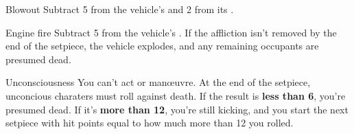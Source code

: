 
\begin{describe}{Blowout}
  Subtract 5 from the vehicle's  and 2 from its .
\end{describe}

\begin{describe}{Engine fire}
  Subtract 5 from the vehicle's . If the affliction isn't removed by the end of the setpiece, the vehicle explodes, and any remaining occupants are presumed dead.
\end{describe}

\begin{describe}{Unconsciousness}
  You can't act or man\oe{}uvre. At the end of the setpiece, unconcious charaters must roll  against death. If the result is \textbf{less than 6}, you're presumed dead. If it's \textbf{more than 12}, you're still kicking, and you start the next setpiece with hit points equal to how much more than 12 you rolled.
\end{describe}
